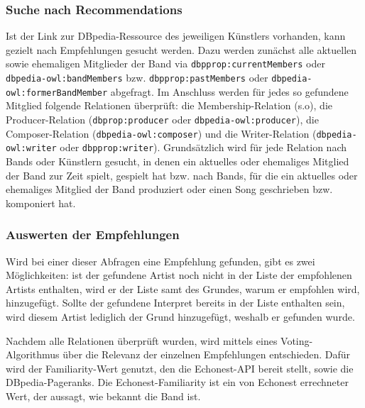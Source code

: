 \subsubsection{Suche nach Recommendations}
Ist der Link zur DBpedia-Ressource des jeweiligen Künstlers vorhanden, kann gezielt nach Empfehlungen gesucht werden. Dazu werden zunächst alle aktuellen sowie ehemaligen Mitglieder der Band via \texttt{dbpprop:currentMembers} oder \texttt{dbpedia-owl:bandMembers}  bzw. \texttt{dbpprop:pastMembers} oder \texttt{dbpedia-owl:formerBandMember} abgefragt. Im Anschluss werden für jedes so gefundene Mitglied folgende Relationen überprüft: die Membership-Relation (s.o), die Producer-Relation (\texttt{dbprop:producer} oder \texttt{dbpedia-owl:producer}), die Composer-Relation (\texttt{dbpedia-owl:composer}) und die Writer-Relation (\texttt{dbpedia-owl:writer} oder \texttt{dbpprop:writer}). Grundsätzlich wird für jede Relation nach Bands oder Künstlern gesucht, in denen ein aktuelles oder ehemaliges Mitglied der Band zur Zeit spielt, gespielt hat bzw. nach Bands, für die ein aktuelles oder ehemaliges Mitglied der Band produziert oder einen Song geschrieben bzw. komponiert hat. 

\subsubsection{Auswerten der Empfehlungen}
Wird bei einer dieser Abfragen eine Empfehlung gefunden, gibt es zwei Möglichkeiten: ist der gefundene Artist noch nicht in der Liste der empfohlenen Artists enthalten, wird er der Liste samt des Grundes, warum er empfohlen wird, hinzugefügt. Sollte der gefundene Interpret bereits in der Liste enthalten sein, wird diesem Artist lediglich der Grund hinzugefügt, weshalb er gefunden wurde.  %


Nachdem alle Relationen überprüft wurden, wird mittels eines Voting-Algorithmus über die Relevanz der einzelnen Empfehlungen entschieden. Dafür wird der Familiarity-Wert genutzt, den die Echonest-API bereit stellt, sowie die DBpedia-Pageranks. Die Echonest-Familiarity ist ein von Echonest errechneter Wert, der aussagt, wie bekannt die Band ist.\cite{echonest_familiarity}

